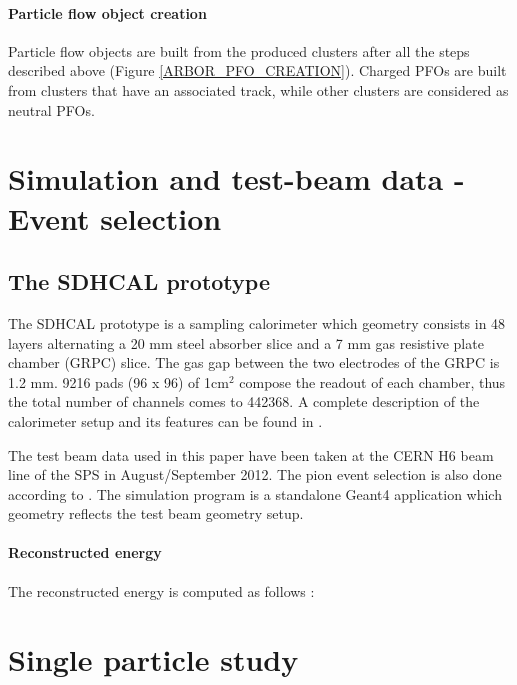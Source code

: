\documentclass[cits]{JINST}
\begin{document}
\paragraph*{Particle flow object creation} Particle flow objects are built from the produced clusters after all the steps described above (Figure \ref{ARBOR_PFO_CREATION}). Charged PFOs are built from clusters that have an associated track, while other clusters are considered as neutral PFOs.



\section{Simulation and test-beam data - Event selection}

\subsection{The SDHCAL prototype}

The SDHCAL prototype is a sampling calorimeter which geometry consists in 48 layers alternating a 20 mm steel absorber slice and a 7 mm gas resistive plate chamber (GRPC) slice. The gas gap between the two electrodes of the GRPC is 1.2 mm. 9216 pads (96 x 96) of 1cm$^2$ compose the readout of each chamber, thus the total number of channels  comes to 442368. A complete description of the calorimeter setup and its features can be found in \cite{sdhcal-paper}. 

The test beam data used in this paper have been taken at the CERN H6 beam line of the SPS in August/September 2012. The pion event selection is also done according to \cite{sdhcal-paper}. The simulation program is a standalone Geant4 application which geometry reflects the test beam geometry setup.

\paragraph*{Reconstructed energy} The reconstructed energy is computed as follows :

  

\section{Single particle study}
\end{document}
